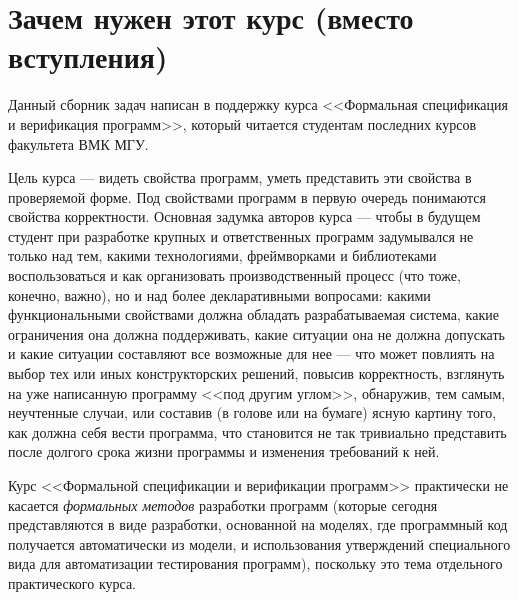 \pagebreak
\section*{Зачем нужен этот курс (вместо вступления)}

Данный сборник задач написан в поддержку курса <<Формальная спецификация и верификация программ>>, который читается студентам последних курсов факультета ВМК МГУ.

Цель курса --- видеть свойства программ, уметь представить эти свойства в проверяемой форме. Под свойствами программ в первую очередь понимаются свойства корректности. Основная задумка авторов курса --- чтобы в будущем студент при разработке крупных и ответственных программ задумывался не только над тем, какими технологиями, фреймворками и библиотеками воспользоваться и как организовать производственный процесс (что тоже, конечно, важно), но и над более декларативными вопросами: какими функциональными свойствами должна обладать разрабатываемая система, какие ограничения она должна поддерживать, какие ситуации она не должна допускать и какие ситуации составляют все возможные для нее --- что может повлиять на выбор тех или иных конструкторских решений, повысив корректность, взглянуть на уже написанную программу <<под другим углом>>, обнаружив, тем самым, неучтенные случаи, или составив (в голове или на бумаге) ясную картину того, как должна себя вести программа, что становится не так тривиально представить после долгого срока жизни программы и изменения требований к ней.

Курс <<Формальной спецификации и верификации программ>> практически не касается \emph{формальных методов} разработки программ (которые сегодня представляются в виде разработки, основанной на моделях, где программный код получается автоматически из модели, и использования утверждений специального вида для автоматизации тестирования программ), поскольку это тема отдельного практического курса.

